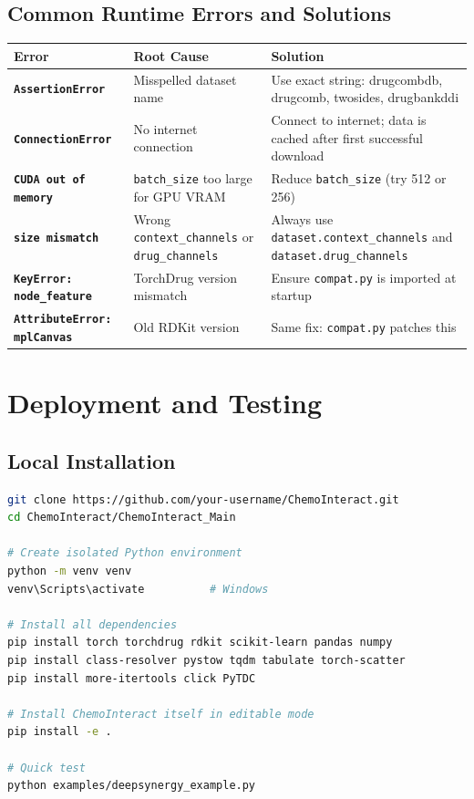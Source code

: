 \documentclass[12pt,a4paper,oneside]{book}
\begin{document}
\section{Common Runtime Errors and Solutions}

\begin{longtable}{>{\bfseries}p{3.5cm}p{5cm}p{5.5cm}}
\toprule
Error & Root Cause & Solution \\
\midrule\endhead
\texttt{AssertionError} & Misspelled dataset name & Use exact string: drugcombdb, drugcomb, twosides, drugbankddi \\
\texttt{ConnectionError} & No internet connection & Connect to internet; data is cached after first successful download \\
\texttt{CUDA out of memory} & \texttt{batch\_size} too large for GPU VRAM & Reduce \texttt{batch\_size} (try 512 or 256) \\
\texttt{size mismatch} & Wrong \texttt{context\_channels} or \texttt{drug\_channels} & Always use \texttt{dataset.context\_channels} and \texttt{dataset.drug\_channels} \\
\texttt{KeyError: node\_feature} & TorchDrug version mismatch & Ensure \texttt{compat.py} is imported at startup \\
\texttt{AttributeError: mplCanvas} & Old RDKit version & Same fix: \texttt{compat.py} patches this \\
\bottomrule
\end{longtable}
\chapter{Deployment and Testing}\label{chap:deployment}

\section{Local Installation}

\begin{lstlisting}[language=bash]
git clone https://github.com/your-username/ChemoInteract.git
cd ChemoInteract/ChemoInteract_Main

# Create isolated Python environment
python -m venv venv
venv\Scripts\activate          # Windows

# Install all dependencies
pip install torch torchdrug rdkit scikit-learn pandas numpy
pip install class-resolver pystow tqdm tabulate torch-scatter
pip install more-itertools click PyTDC

# Install ChemoInteract itself in editable mode
pip install -e .

# Quick test
python examples/deepsynergy_example.py
\end{lstlisting}
\end{document}
